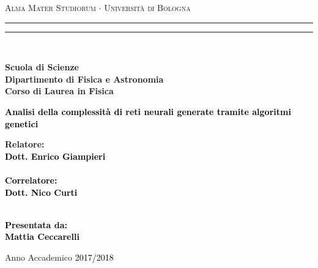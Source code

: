 \documentclass[12pt,a4paper]{report}
\begin{document}
\begin{titlepage}

%
%
%
%
\begin{center}
{{\Large{\textsc{Alma Mater Studiorum $\cdot$ Universit\`a di Bologna}}}} 
\rule[0.1cm]{15.8cm}{0.1mm}
\rule[0.5cm]{15.8cm}{0.6mm}
\\\vspace{3mm}

{\small{\bf Scuola di Scienze \\ 
Dipartimento di Fisica e Astronomia\\
Corso di Laurea in Fisica}}

\end{center}

\vspace{23mm}

\begin{center}\textcolor{black}{
%
%
{\LARGE{\bf Analisi della complessità di reti neurali generate tramite algoritmi genetici}}\\
}\end{center}

\vspace{50mm} \par \noindent

\begin{minipage}[t]{0.47\textwidth}
%
%
{\large{\bf Relatore: \vspace{2mm}\\\textcolor{black}{
Dott. Enrico Giampieri}\\\\
%
%
%
\textcolor{black}{
\bf Correlatore: 
\vspace{2mm}\\
Dott. Nico Curti\\\\}}}
\end{minipage}
%
\hfill
%
\begin{minipage}[t]{0.47\textwidth}\raggedleft \textcolor{black}{
{\large{\bf Presentata da:
\vspace{2mm}\\
%
%
Mattia Ceccarelli}}}
\end{minipage}

\vspace{38mm} %

\begin{center}
%
%
Anno Accademico \textcolor{black}{ 2017/2018}
\end{center}

\end{titlepage}
\end{document}
